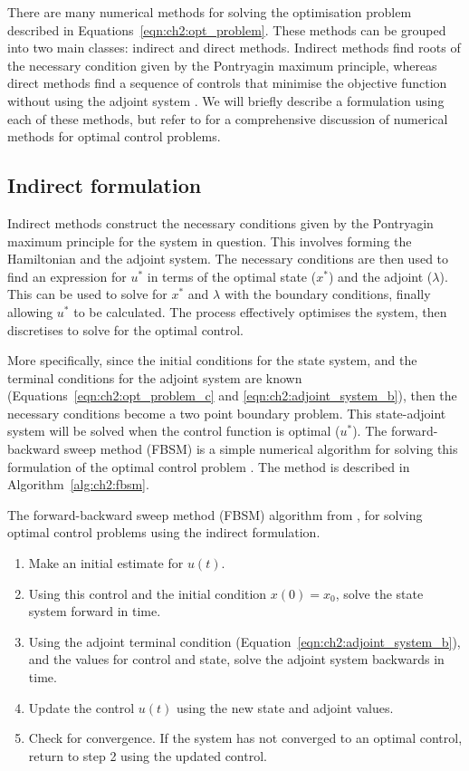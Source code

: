There are many numerical methods for solving the optimisation problem described in Equations~\ref{eqn:ch2:opt_problem}. These methods can be grouped into two main classes: indirect and direct methods. Indirect methods find roots of the necessary condition given by the Pontryagin maximum principle, whereas direct methods find a sequence of controls that minimise the objective function without using the adjoint system \citep{betts_practical_2010}. We will briefly describe a formulation using each of these methods, but refer to \citet{betts_practical_2010} for a comprehensive discussion of numerical methods for optimal control problems.

\subsection{Indirect formulation}

Indirect methods construct the necessary conditions given by the Pontryagin maximum principle for the system in question. This involves forming the Hamiltonian and the adjoint system. The necessary conditions are then used to find an expression for $u^*$ in terms of the optimal state ($x^*$) and the adjoint ($\lambda$). This can be used to solve for $x^*$ and $\lambda$ with the boundary conditions, finally allowing $u^*$ to be calculated. The process effectively optimises the system, then discretises to solve for the optimal control.

More specifically, since the initial conditions for the state system, and the terminal conditions for the adjoint system are known (Equations~\ref{eqn:ch2:opt_problem_c} and \ref{eqn:ch2:adjoint_system_b}), then the necessary conditions become a two point boundary problem. This state-adjoint system will be solved when the control function is optimal ($u^*$). The forward-backward sweep method (FBSM) is a simple numerical algorithm for solving this formulation of the optimal control problem \citep{lenhart_optimal_2007}. The method is described in Algorithm~\ref{alg:ch2:fbsm}.

\begin{algorithm}
    \caption{The forward-backward sweep method (FBSM) algorithm from \citet{lenhart_optimal_2007}, for solving optimal control problems using the indirect formulation.\label{alg:ch2:fbsm}}
    \begin{enumerate}
        \item Make an initial estimate for $u(t)$.
        \item Using this control and the initial condition $x(0)=x_0$, solve the state system forward in time.
        \item Using the adjoint terminal condition (Equation~\ref{eqn:ch2:adjoint_system_b}), and the values for control and state, solve the adjoint system backwards in time.
        \item Update the control $u(t)$ using the new state and adjoint values.
        \item Check for convergence. If the system has not converged to an optimal control, return to step 2 using the updated control.
    \end{enumerate}
\end{algorithm}

